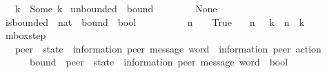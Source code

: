 \begin{isabellebody}
\ \ {\isachardoublequoteopen}{\isasymB}\ k\ {\isasymequiv}\ Some\ k{\isachardoublequoteclose}\isanewline
\isanewline
{}\isamarkupfalse%
\ unbounded\ {\isacharcolon}{\kern0pt}{\isacharcolon}{\kern0pt}\ {\isachardoublequoteopen}bound{\isachardoublequoteclose}\ \ {\isacharparenleft}{\kern0pt}{\isachardoublequoteopen}{\isasyminfinity}{\isachardoublequoteclose}\ {}{}{}{\isacharparenright}{\kern0pt}\ \isanewline
\ \ {\isachardoublequoteopen}{\isasyminfinity}\ {\isasymequiv}\ None{\isachardoublequoteclose}\isanewline
\isanewline
{}\isamarkupfalse%
\ is{\isacharunderscore}{\kern0pt}bounded\ {\isacharcolon}{\kern0pt}{\isacharcolon}{\kern0pt}\ {\isachardoublequoteopen}nat\ {\isasymRightarrow}\ bound\ {\isasymRightarrow}\ bool{\isachardoublequoteclose}\ \ {\isacharparenleft}{\kern0pt}{\isachardoublequoteopen}{\isacharunderscore}{\kern0pt}\ {\isacharless}{\kern0pt}\isactrlsub {\isasymB}\ {\isacharunderscore}{\kern0pt}{\isachardoublequoteclose}\ {\isacharbrackleft}{\kern0pt}{}{}{\isacharcomma}{\kern0pt}\ {}{}{\isacharbrackright}{\kern0pt}\ {}{}{}{\isacharparenright}{\kern0pt}\ \isanewline
\ \ {\isachardoublequoteopen}n\ {\isacharless}{\kern0pt}\isactrlsub {\isasymB}\ {\isasyminfinity}\ {\isacharequal}{\kern0pt}\ True{\isachardoublequoteclose}\ {\isacharbar}{\kern0pt}\isanewline
\ \ {\isachardoublequoteopen}n\ {\isacharless}{\kern0pt}\isactrlsub {\isasymB}\ {\isasymB}\ k\ {\isacharequal}{\kern0pt}\ {\isacharparenleft}{\kern0pt}n\ {\isacharless}{\kern0pt}\ k{\isacharparenright}{\kern0pt}{\isachardoublequoteclose}\isanewline
\isanewline
{}\isamarkupfalse%
\ mbox{\isacharunderscore}{\kern0pt}step\isanewline
\ \ {\isacharcolon}{\kern0pt}{\isacharcolon}{\kern0pt}\ {\isachardoublequoteopen}{\isacharparenleft}{\kern0pt}{\isacharprime}{\kern0pt}peer\ {\isasymRightarrow}\ {\isacharparenleft}{\kern0pt}{\isacharprime}{\kern0pt}state\ {\isasymtimes}\ {\isacharparenleft}{\kern0pt}{\isacharprime}{\kern0pt}information{\isacharcomma}{\kern0pt}\ {\isacharprime}{\kern0pt}peer{\isacharparenright}{\kern0pt}\ message\ word{\isacharparenright}{\kern0pt}{\isacharparenright}{\kern0pt}\ {\isasymRightarrow}\ {\isacharparenleft}{\kern0pt}{\isacharprime}{\kern0pt}information{\isacharcomma}{\kern0pt}\ {\isacharprime}{\kern0pt}peer{\isacharparenright}{\kern0pt}\ action\ {\isasymRightarrow}\isanewline
\ \ \ \ \ \ bound\ {\isasymRightarrow}\ {\isacharparenleft}{\kern0pt}{\isacharprime}{\kern0pt}peer\ {\isasymRightarrow}\ {\isacharparenleft}{\kern0pt}{\isacharprime}{\kern0pt}state\ {\isasymtimes}\ {\isacharparenleft}{\kern0pt}{\isacharprime}{\kern0pt}information{\isacharcomma}{\kern0pt}\ {\isacharprime}{\kern0pt}peer{\isacharparenright}{\kern0pt}\ message\ word{\isacharparenright}{\kern0pt}{\isacharparenright}{\kern0pt}\ {\isasymRightarrow}\ bool{\isachardoublequoteclose}\ \isanewline

\end{isabellebody}
